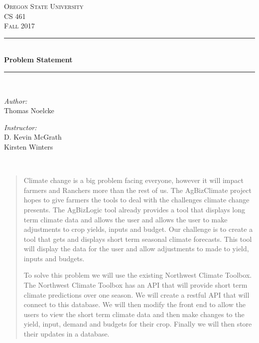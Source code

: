 \documentclass[letterpaper,10pt]{article}
\begin{document}
    \begin{titlepage}
    \newcommand{\HRule}{\rule{\linewidth}{0.5mm}}
    \center
    \textsc{\Large Oregon State University}\\[1.5cm]
    \textsc{\Large CS 461}\\[0.5cm]
    \textsc{\Large Fall 2017}\\[0.5cm]
    \HRule \\[0.4cm]
    { \huge \bfseries Problem Statement}\\[0.4cm] %
    \HRule \\[1.5cm]
    \begin{minipage}{0.4\textwidth}
        \begin{flushleft} \large
        \emph{Author:}\\
        Thomas Noelcke
        \end{flushleft}
    \end{minipage}
    \begin{minipage}{0.4\textwidth}
        \begin{flushright} \large
        \emph{Instructor:} \\
        D. Kevin McGrath\\
        Kirsten Winters
        \end{flushright}
    \end{minipage}\\[2cm]
    \begin{abstract}
    \item 
						Climate change is a big problem facing everyone, however it will impact farmers and Ranchers more than the rest of us. The AgBizClimate project hopes to give farmers the tools to deal with the challenges climate change presents. The AgBizLogic tool already provides a tool that displays long term climate data and allows the user and allows the user to make adjustments to crop yields, inputs and budget. Our challenge is to create a tool that gets and displays short term seasonal climate forecasts. This tool will display the data for the user and allow adjustments to made to yield, inputs and budgets.
			
			To solve this problem we will use the existing Northwest Climate Toolbox. The Northwest Climate Toolbox has an API that will provide short term climate predictions over one season. We will create a restful API that will connect to this database. We will then modify the front end to allow the users to view the short term climate data and then make changes to the yield, input, demand and budgets for their crop. Finally we will then store their updates in a database.

    \end{abstract}
    \vfill %
    \end{titlepage}
		
\end{document}
